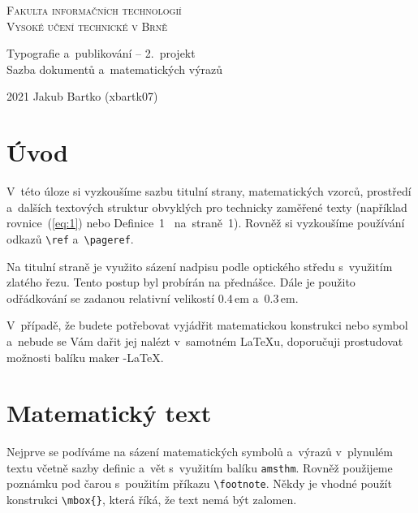 \documentclass[a4paper, 11pt, twocolumn]{article}
\begin{document}
\begin{titlepage}

\begin{center}
\Huge
\textsc{Fakulta informačních technologií \\
Vysoké učení technické v Brně} \\

\LARGE
Typografie a~publikování -- 2.~projekt \\
Sazba dokumentů a~matematických výrazů \\
\end{center}

{\Large 2021 \hfill
Jakub Bartko (xbartk07)}
\end{titlepage}

\section*{Úvod}
V~této úloze si vyzkoušíme sazbu titulní strany, matematických vzorců, prostředí a~dalších textových struktur obvyklých pro technicky zaměřené texty (například rovnice~(\ref{eq:1}) nebo Definice~1~ na~straně~1). Rovněž si vyzkoušíme používání odkazů \verb|\ref| a~\verb|\pageref|.

Na titulní straně je využito sázení nadpisu podle optického středu s~využitím zlatého řezu. Tento postup byl probírán na přednášce. Dále je použito odřádkování se zadanou relativní velikostí 0.4\,em a~0.3\,em.

V~případě, že budete potřebovat vyjádřit matematickou konstrukci nebo symbol a~nebude se Vám dařit jej nalézt v~samotném \LaTeX u, doporučuji prostudovat možnosti balíku maker \AmS-\LaTeX.

\section{Matematický text}
Nejprve se podíváme na sázení matematických symbolů a~výrazů v~plynulém textu včetně sazby definic a~vět s~využitím balíku \texttt{amsthm}. Rovněž použijeme poznámku pod čarou s~použitím příkazu \verb|\footnote|. Někdy je vhodné použít konstrukci \verb|\mbox{}|, která říká, že text nemá být zalomen.
\end{document}
